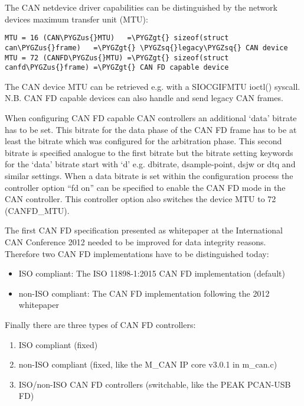\documentclass[a4paper,8pt,english]{sphinxmanual}
\def\PYGZus{\char`\_}
\def\PYGZgt{\char`\>}
\def\PYGZsq{\char`\'}
\renewcommand\PYGZsq{\textquotesingle}
\begin{document}
The CAN netdevice driver capabilities can be distinguished by the network
devices maximum transfer unit (MTU):

\begin{Verbatim}[commandchars=\\\{\}]
MTU = 16 (CAN\PYGZus{}MTU)   =\PYGZgt{} sizeof(struct can\PYGZus{}frame)   =\PYGZgt{} \PYGZsq{}legacy\PYGZsq{} CAN device
MTU = 72 (CANFD\PYGZus{}MTU) =\PYGZgt{} sizeof(struct canfd\PYGZus{}frame) =\PYGZgt{} CAN FD capable device
\end{Verbatim}

The CAN device MTU can be retrieved e.g. with a SIOCGIFMTU ioctl() syscall.
N.B. CAN FD capable devices can also handle and send legacy CAN frames.

When configuring CAN FD capable CAN controllers an additional `data' bitrate
has to be set. This bitrate for the data phase of the CAN FD frame has to be
at least the bitrate which was configured for the arbitration phase. This
second bitrate is specified analogue to the first bitrate but the bitrate
setting keywords for the `data' bitrate start with `d' e.g. dbitrate,
dsample-point, dsjw or dtq and similar settings. When a data bitrate is set
within the configuration process the controller option ``fd on'' can be
specified to enable the CAN FD mode in the CAN controller. This controller
option also switches the device MTU to 72 (CANFD\_MTU).

The first CAN FD specification presented as whitepaper at the International
CAN Conference 2012 needed to be improved for data integrity reasons.
Therefore two CAN FD implementations have to be distinguished today:
\begin{itemize}
\item {} 
ISO compliant:     The ISO 11898-1:2015 CAN FD implementation (default)

\item {} 
non-ISO compliant: The CAN FD implementation following the 2012 whitepaper

\end{itemize}

Finally there are three types of CAN FD controllers:
\begin{enumerate}
\item {} 
ISO compliant (fixed)

\item {} 
non-ISO compliant (fixed, like the M\_CAN IP core v3.0.1 in m\_can.c)

\item {} 
ISO/non-ISO CAN FD controllers (switchable, like the PEAK PCAN-USB FD)

\end{enumerate}
\end{document}
